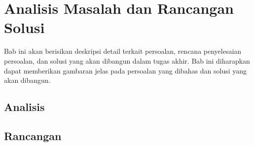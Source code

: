 \chapter{Analisis Masalah dan Rancangan Solusi}

Bab ini akan berisikan deskripsi detail terkait persoalan, rencana penyelesaian persoalan, dan solusi yang akan dibangun dalam tugas akhir. Bab ini diharapkan dapat memberikan gambaran jelas pada persoalan yang dibahas dan solusi yang akan dibangun.


\section{Analisis}







\break

\section{Rancangan}

